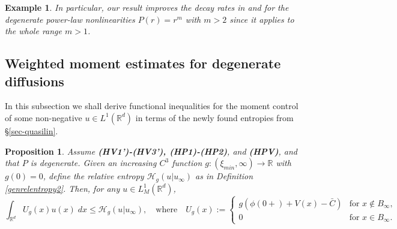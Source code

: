 \documentclass[reqno]{amsart}
\newtheorem{prop}[lemma]{Proposition}
\newtheorem{example}[lemma]{Example}
\newcommand{\R}{\mathbb{R}}
\newcommand{\uinf}{u_\infty}
\begin{document}
\begin{example}\label{ex:comp-CJMTU}
In particular, our result improves the decay rates in \cite[Remark 34]{CJMTU} and \cite[Theorem 31-32]{CJMTU} for the degenerate power-law nonlinearities $P(r)=r^m$ with $m>2$ since it applies to the whole range $m>1$.
\end{example}

\subsection{Weighted moment estimates for degenerate diffusions}

In this subsection we shall derive functional inequalities for the moment control of some non-negative $u\in L^1(\R^d)$ in terms of the newly found entropies from \S\ref{sec-quasilin}.
%
\begin{prop}\label{prop:momentcontroldegenerate}
    Assume {\bf (HV1')-(HV3'), (HP1)-(HP2)}, and {\bf (HPV)}, and that $P$ is degenerate. 
    Given an increasing $C^3$ function $g: (\xi_{min},\infty)\to\R$ with $g(0)=0$, define the relative entropy ${\mathcal{H}}_g(u|\uinf)$ as in Definition \ref{genrelentropy2}. Then, for any $u\in L^1_M(\R^d)$,
    \begin{equation}\label{g-check}
        \int_{\R^d} U_g (x) u(x)\;dx \leq {\mathcal{H}}_g(u|\uinf),
        \quad\text{where}\quad
        U_g (x):=
        \begin{cases}
            g(\phi(0+)+V(x)-\bar C) & \text{for $x\notin B_\infty$}, \\
            0 & \text{for $x\in B_\infty$}.
        \end{cases}
    \end{equation}
\end{prop}
%
\end{document}
